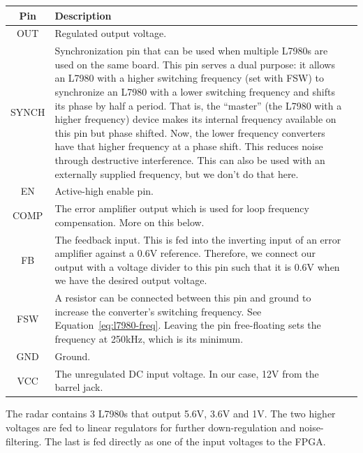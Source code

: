 \label{tab:l7980-pins}
\begin{tabularx}{\textwidth}{c X>{\raggedright\arraybackslash}X}
        \caption{L7980 pin connections.} \\
        \toprule
        \textbf{Pin} & \textbf{Description} \\
        \midrule
        \endhead

        OUT & Regulated output voltage. \\
        SYNCH & Synchronization pin that can be used when multiple L7980s are used on the same board. This
        pin serves a dual purpose: it allows an L7980 with a higher switching frequency (set with FSW) to
        synchronize an L7980 with a lower switching frequency and shifts its phase by half a period. That
        is, the ``master'' (the L7980 with a higher frequency) device makes its internal frequency
        available on this pin but phase shifted. Now, the lower frequency converters have that higher
        frequency at a phase shift. This reduces noise through destructive interference. This can also be
        used with an externally supplied frequency, but we don't do that here. \\
        EN & Active-high enable pin. \\
        COMP & The error amplifier output which is used for loop frequency compensation. More on this
        below. \\
        FB & The feedback input. This is fed into the inverting input of an error amplifier against a 0.6V
        reference. Therefore, we connect our output with a voltage divider to this pin such that it is
        0.6V when we have the desired output voltage. \\
        FSW & A resistor can be connected between this pin and ground to increase the converter's
        switching frequency. See Equation~\ref{eq:l7980-freq}. Leaving the pin free-floating sets the
        frequency at 250kHz, which is its minimum. \\
        GND & Ground. \\
        VCC & The unregulated DC input voltage. In our case, 12V from the barrel jack. \\

        \bottomrule
\end{tabularx}

The radar contains 3 L7980s that output 5.6V, 3.6V and 1V. The two higher voltages are fed to linear
regulators for further down-regulation and noise-filtering. The last is fed directly as one of the
input voltages to the FPGA.

